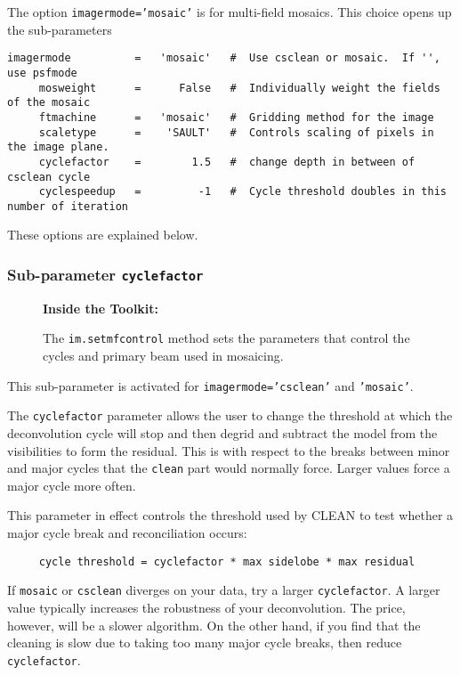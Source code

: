 The option {\tt imagermode='mosaic'} is for multi-field mosaics.  This
choice opens up the sub-parameters 
\small
\begin{verbatim}
imagermode          =   'mosaic'   #  Use csclean or mosaic.  If '', use psfmode
     mosweight      =      False   #  Individually weight the fields of the mosaic
     ftmachine      =   'mosaic'   #  Gridding method for the image
     scaletype      =    'SAULT'   #  Controls scaling of pixels in the image plane.
     cyclefactor    =        1.5   #  change depth in between of  csclean cycle
     cyclespeedup   =         -1   #  Cycle threshold doubles in this number of iteration
\end{verbatim}
\normalsize
These options are explained below.  

\subsubsection{Sub-parameter {\tt cyclefactor} }
\label{section:im.clean.imagermode.cyclefactor}

\begin{wrapfigure}{r}{2.5in}
  \begin{boxedminipage}{2.5in}
     \centerline{\bf Inside the Toolkit:}
     The {\tt im.setmfcontrol} method sets the parameters that control
     the cycles and primary beam used in mosaicing.
  \end{boxedminipage}
\end{wrapfigure}

This sub-parameter is activated for {\tt imagermode='csclean'} and
{\tt 'mosaic'}.

The {\tt cyclefactor} parameter allows the user to change the
threshold at which the deconvolution cycle will stop and then degrid and
subtract the model from the visibilities to form the residual. This is
with respect to the breaks between minor and major cycles that the
{\tt clean} part would normally force.  Larger values force a major
cycle more often.  

This parameter in effect controls the threshold used by CLEAN to test whether
a major cycle break and reconciliation occurs:
\small
\begin{verbatim}
     cycle threshold = cyclefactor * max sidelobe * max residual
\end{verbatim}
\normalsize


If {\tt mosaic} or {\tt csclean} diverges on your data, try a larger
{\tt cyclefactor}. A larger value typically increases the
robustness of your deconvolution. The price, however, will be a slower
algorithm.  On the other hand, if you find that the cleaning is slow
due to taking too many major cycle breaks, then reduce
{\tt cyclefactor}.

